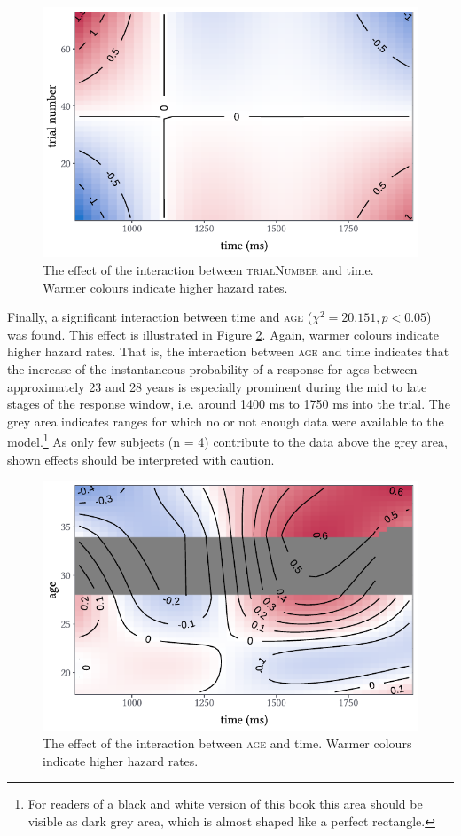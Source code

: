 \begin{figure}
    \centering
    \includegraphics[]{figures/fig7.5.pdf}
    \caption{The effect of the interaction between \textsc{trialNumber} and time. Warmer colours indicate higher hazard rates.}
    \label{fig:7_5}
\end{figure}

Finally, a significant interaction between time and \textsc{age} ($χ^{2}=20.151, p<0.05$) was found. This effect is illustrated in Figure \ref{fig:7_6}. Again, warmer colours indicate higher hazard rates. That is, the interaction between \textsc{age} and time indicates that the increase of the instantaneous probability of a response for ages between approximately 23 and 28 years is especially prominent during the mid to late stages of the response window, i.e. around 1400 ms to 1750 ms into the trial. The grey area indicates ranges for which no or not enough data were available to the model.\footnote{For readers of a black and white version of this book this area should be visible as dark grey area, which is almost shaped like a perfect rectangle.} As only few subjects (n = 4) contribute to the data above the grey area, shown effects should be interpreted with caution. 

\begin{figure}
    \centering
    \includegraphics[]{figures/fig7.6.pdf}
    \caption{The effect of the interaction between \textsc{age} and time. Warmer colours indicate higher hazard rates.}
    \label{fig:7_6}
\end{figure}

